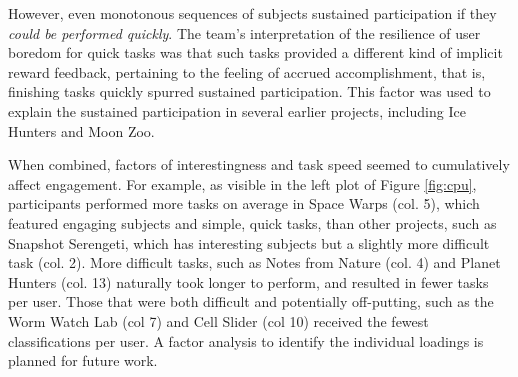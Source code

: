 \documentclass{sigchi}
\begin{document}


However, even monotonous sequences of subjects sustained participation if they \emph{could be performed quickly}. The team's interpretation of the resilience of user boredom for quick tasks was that such tasks provided a different kind of implicit reward feedback, pertaining to the feeling of accrued accomplishment, that is, finishing tasks quickly spurred sustained participation.  This factor was used to explain the sustained participation in several earlier projects, including Ice Hunters and Moon Zoo.

When combined, factors of interestingness and task speed seemed to cumulatively affect engagement. For example, as visible in the left plot of Figure \ref{fig:cpu}, participants performed more tasks on average in Space Warps (col. 5), which featured engaging subjects and simple, quick tasks, than other projects, such as Snapshot Serengeti, which has interesting subjects but a slightly more difficult task (col. 2). More difficult tasks, such as Notes from Nature (col. 4) and Planet Hunters (col. 13) naturally took longer to perform, and resulted in fewer tasks per user.  Those that were both difficult and potentially off-putting, such as the Worm Watch Lab (col 7) and Cell Slider (col 10) received the fewest classifications per user.  A factor analysis to identify the individual loadings is planned for future work.  




\end{document}
